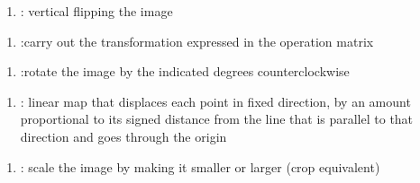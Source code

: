 \documentclass[letterpaper,10pt,english]{sphinxmanual}
\begin{document}
\begin{enumerate}
%
\setcounter{enumi}{1}
\item {} 
: vertical flipping the image

\end{enumerate}

\begin{enumerate}
%
\setcounter{enumi}{2}
\item {} 
:carry out the transformation expressed in the operation matrix

\end{enumerate}

\begin{enumerate}
%
\setcounter{enumi}{3}
\item {} 
:rotate the image by the indicated degrees counterclockwise

\end{enumerate}

\begin{enumerate}
%
\setcounter{enumi}{4}
\item {} 
: linear map that displaces each point in fixed direction, by an amount proportional to its signed distance from the line that is parallel to that direction and goes through the origin

\end{enumerate}

\begin{enumerate}
%
\setcounter{enumi}{5}
\item {} 
: scale the image by making it smaller or larger (crop equivalent)

\end{enumerate}
\end{document}
